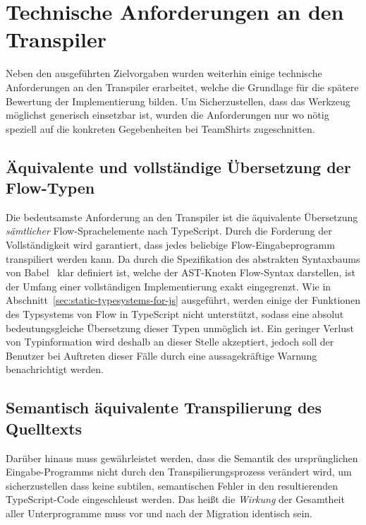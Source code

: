 \section{Technische Anforderungen an den Transpiler}
\label{sec:requirements}

Neben den ausgeführten Zielvorgaben wurden weiterhin einige technische Anforderungen an den Transpiler erarbeitet, welche die Grundlage für die spätere Bewertung der Implementierung bilden. Um Sicherzustellen, dass das Werkzeug möglichst generisch einsetzbar ist, wurden die Anforderungen nur wo nötig speziell auf die konkreten Gegebenheiten bei TeamShirts zugeschnitten.

\subsection{Äquivalente und vollständige Übersetzung der Flow-Typen}
\label{subsec:requirement:completeness}

Die bedeutsamste Anforderung an den Transpiler ist die äquivalente Übersetzung \emph{sämtlicher} Flow-Sprachelemente nach TypeScript. Durch die Forderung der Vollständigkeit wird garantiert, dass jedes beliebige Flow-Eingabeprogramm transpiliert werden kann. Da durch die Spezifikation des abstrakten Syntaxbaums von Babel~\autocite{BABEL:PARSER_SPEC} klar definiert ist, welche der AST-Knoten Flow-Syntax darstellen, ist der Umfang einer vollständigen Implementierung exakt eingegrenzt.
Wie in Abschnitt~\ref{sec:static-typesystems-for-js} ausgeführt, werden einige der Funktionen des Typsystems von Flow in TypeScript nicht unterstützt, sodass eine absolut bedeutungsgleiche Übersetzung dieser Typen unmöglich ist. Ein geringer Verlust von Typinformation wird deshalb an dieser Stelle akzeptiert, jedoch soll der Benutzer bei Auftreten dieser Fälle durch eine aussagekräftige Warnung benachrichtigt werden.

\subsection{Semantisch äquivalente Transpilierung des Quelltexts}
\label{subsec:requirement:semantic-equivalence}

Darüber hinaus muss gewährleistet werden, dass die Semantik des ursprünglichen Eingabe-Programms nicht durch den Transpilierungsprozess verändert wird, um sicherzustellen dass keine subtilen, semantischen Fehler in den resultierenden TypeScript-Code eingeschleust werden. Das heißt die \emph{Wirkung} der Gesamtheit aller Unterprogramme muss vor und nach der Migration identisch sein.

